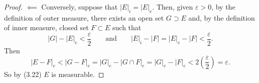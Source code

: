 \begin{proof}
$\impliedby$ Conversely, suppose that
$\left|E\right|_i=\left|E\right|_e$. Then, given $\varepsilon>0$, by the
definition of outer measure, there exists an open set $G\supset E$ and, by
the definition of inner measure, closed set $F\subset E$ such that
\begin{equation}
  \label{eq:inner-outer-approximation}
\left|G\right|-\left|E\right|_e<\frac{\varepsilon}{2}\qquad\text{and}\qquad
\left|E\right|_i-\left|F\right|=
\left|E\right|_e-\left|F\right|<\frac{\varepsilon}{2}.
\end{equation}
Then
\[
\left|E\minus F\right|_e
<\left|G\minus F\right|_e
=\left|G\right|_e-\left|G\cap F\right|_e
=\left|G\right|_e-\left|F\right|_e
<2\left(\frac{\varepsilon}{2}\right)=\varepsilon.
\]
So by (3.22) $E$ is measurable.
\end{proof}
\newpage


